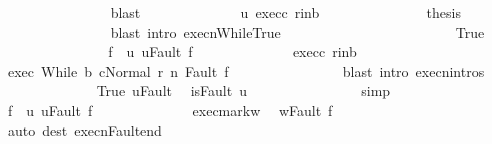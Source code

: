 \begin{isabellebody}
\ \ \ \ \ \ \ \ \ \ \ \ \ \ \isamarkupfalse%
\ blast\isanewline
\ \ \ \ \ \ \ \ \ \ \ \ \isamarkupfalse%
\ u{\isacharprime}\ exec{\isacharunderscore}c\ r{\isacharunderscore}in{\isacharunderscore}b\ \isanewline
\ \ \ \ \ \ \ \ \ \ \ \ \isamarkupfalse%
\ {\isacharquery}thesis\isanewline
\ \ \ \ \ \ \ \ \ \ \ \ \ \ \isamarkupfalse%
\ {\isacharparenleft}blast\ intro{\isacharcolon}\ execn{\isachardot}WhileTrue{\isacharparenright}\isanewline
\ \ \ \ \ \ \ \ \ \ \isamarkupfalse%
\isanewline
\ \ \ \ \ \ \ \ \ \ \ \ \isamarkupfalse%
\ True\isanewline
\ \ \ \ \ \ \ \ \ \ \ \ \isamarkupfalse%
\ \isamarkupfalse%
\ f{\isacharprime}\ \ u{\isacharprime}{\isacharcolon}\ {\isachardoublequoteopen}u{\isacharprime}{\isacharequal}Fault\ f{\isacharprime}{\isachardoublequoteclose}\isacommand{{\isachardot}{\isachardot}}\isamarkupfalse%
\isanewline
\ \ \ \ \ \ \ \ \ \ \ \ \isamarkupfalse%
\ exec{\isacharunderscore}c\ r{\isacharunderscore}in{\isacharunderscore}b\ \isanewline
\ \ \ \ \ \ \ \ \ \ \ \ \isamarkupfalse%
\ exec{\isacharcolon}\ {\isachardoublequoteopen}{\isasymGamma}{\isasymturnstile}{\isasymlangle}While\ b\ c{\isacharcomma}Normal\ r{\isasymrangle}\ {\isacharequal}n{\isasymRightarrow}\ Fault\ f{\isacharprime}{\isachardoublequoteclose}\isanewline
\ \ \ \ \ \ \ \ \ \ \ \ \ \ \isamarkupfalse%
\ {\isacharparenleft}blast\ intro{\isacharcolon}\ execn{\isachardot}intros{\isacharparenright}\isanewline
\ \ \ \ \ \ \ \ \ \ \ \ \isamarkupfalse%
\ True\ u{\isacharprime}{\isacharunderscore}Fault\ \isamarkupfalse%
\ {\isachardoublequoteopen}isFault\ u{\isachardoublequoteclose}\isanewline
\ \ \ \ \ \ \ \ \ \ \ \ \ \ \isamarkupfalse%
\ simp\isanewline
\ \ \ \ \ \ \ \ \ \ \ \ \isamarkupfalse%
\ \isamarkupfalse%
\ f\ \ u{\isacharcolon}\ {\isachardoublequoteopen}u{\isacharequal}Fault\ f{\isachardoublequoteclose}\isacommand{{\isachardot}{\isachardot}}\isamarkupfalse%
\isanewline
\ \ \ \ \ \ \ \ \ \ \ \ \isamarkupfalse%
\ exec{\isacharunderscore}mark{\isacharunderscore}w\ \isamarkupfalse%
\ {\isachardoublequoteopen}w{\isacharequal}Fault\ f{\isachardoublequoteclose}\isanewline
\ \ \ \ \ \ \ \ \ \ \ \ \ \ \isamarkupfalse%
\ {\isacharparenleft}auto\ dest{\isacharcolon}\ execn{\isacharunderscore}Fault{\isacharunderscore}end{\isacharparenright}\isanewline

\end{isabellebody}
